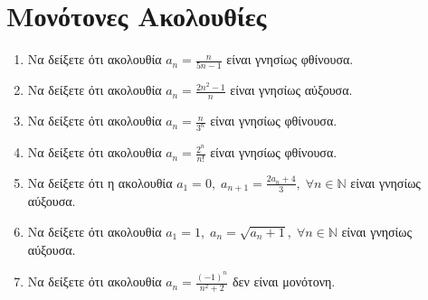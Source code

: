 \section{Μονότονες Ακολουθίες}

\begin{enumerate}
  \item Να δείξετε ότι ακολουθία $ a_{n} = \frac{n}{5n-1} $ είναι 
    γνησίως φθίνουσα.
  \item Να δείξετε ότι ακολουθία $ a_{n} = \frac{2n^{2}-1}{n} $ είναι γνησίως 
    αύξουσα.
  \item Να δείξετε ότι ακολουθία $ a_{n} = \frac{n}{3^{n}} $ είναι 
    γνησίως φθίνουσα.
  \item Να δείξετε ότι ακολουθία $ a_{n} = \frac{2^{n}}{n!} $ είναι 
    γνησίως φθίνουσα.
  \item Να δείξετε ότι η ακολουθία $ a_{1}=0, \; a_{n+1}= 
    \frac{2 a_{n}+4}{3}, \; \forall n \in \mathbb{N} $ είναι γνησίως αύξουσα.
  \item Να δείξετε ότι ακολουθία $ a_{1}=1, \; a_{n} = \sqrt{a_{n}+1}, \; 
    \forall n \in \mathbb{N}$ είναι γνησίως αύξουσα.
  \item Να δείξετε ότι ακολουθία $ a_{n} =  \frac{(-1)^{n}}{n^{2}+2} $ 
    δεν είναι μονότονη. 
\end{enumerate}






